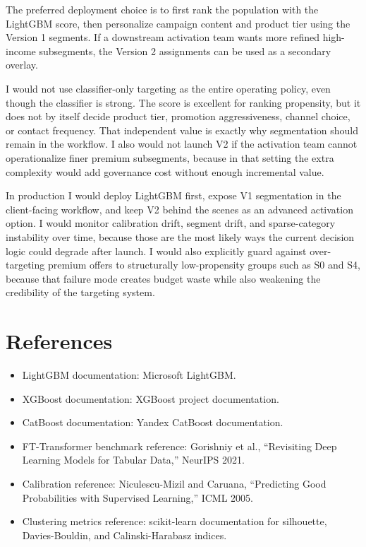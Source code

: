 \documentclass[12pt]{article}
\begin{document}
The preferred deployment choice is to first rank the population with the
LightGBM score, then personalize campaign content and product tier using the
Version 1 segments. If a downstream activation team wants more refined
high-income subsegments, the Version 2 assignments can be used as a secondary
overlay.

I would not use classifier-only targeting as the entire operating policy, even
though the classifier is strong. The score is excellent for ranking propensity,
but it does not by itself decide product tier, promotion aggressiveness, channel
choice, or contact frequency. That independent value is exactly why segmentation
should remain in the workflow. I also would not launch V2 if the activation team
cannot operationalize finer premium subsegments, because in that setting the
extra complexity would add governance cost without enough incremental value.

In production I would deploy LightGBM first, expose V1 segmentation in the
client-facing workflow, and keep V2 behind the scenes as an advanced activation
option. I would monitor calibration drift, segment drift, and sparse-category
instability over time, because those are the most likely ways the current
decision logic could degrade after launch. I would also explicitly guard against
over-targeting premium offers to structurally low-propensity groups such as S0
and S4, because that failure mode creates budget waste while also weakening the
credibility of the targeting system.

\enlargethispage{2\baselineskip}
\section{References}

\begin{itemize}
\item LightGBM documentation: Microsoft LightGBM.
\item XGBoost documentation: XGBoost project documentation.
\item CatBoost documentation: Yandex CatBoost documentation.
\item FT-Transformer benchmark reference: Gorishniy et al., ``Revisiting Deep
Learning Models for Tabular Data,'' NeurIPS 2021.
\item Calibration reference: Niculescu-Mizil and Caruana, ``Predicting Good
Probabilities with Supervised Learning,'' ICML 2005.
\item Clustering metrics reference: scikit-learn documentation for silhouette,
Davies-Bouldin, and Calinski-Harabasz indices.
\end{itemize}
\end{document}
